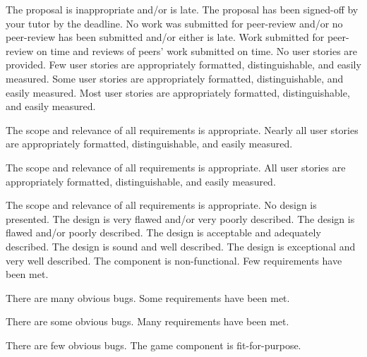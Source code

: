 \documentclass{../fal_assignment}
\begin{document}
\begin{markingrubric}
%
        \grade\fail 	The proposal is inappropriate and/or is late.
        \grade 
        \grade 
        \grade 
        \grade 
        \grade 		The proposal has been signed-off by your tutor by the deadline.
%
        \grade\fail 	No work was submitted for peer-review and/or no peer-review has been submitted and/or either is late.
        \grade 
        \grade 
        \grade 
        \grade 
        \grade 		Work submitted for peer-review on time and reviews of peers' work submitted on time.
%
        \grade\fail 	No user stories are provided.
        \grade 		Few user stories are appropriately formatted, distinguishable, and easily measured.
        \grade 		Some user stories are appropriately formatted, distinguishable, and easily measured.
        \grade 		Most user stories are appropriately formatted, distinguishable, and easily measured.
        \par 		The scope and relevance of all requirements is appropriate.
        \grade 		Nearly all user stories are appropriately formatted, distinguishable, and easily measured.
        \par 		The scope and relevance of all requirements is appropriate.
        \grade 		All user stories are appropriately formatted, distinguishable, and easily measured.
        \par 		The scope and relevance of all requirements is appropriate.
%
        \grade\fail 	No design is presented.
        \grade 		The design is very flawed and/or very poorly described.
        \grade 		The design is flawed and/or poorly described.
        \grade 		The design is acceptable and adequately described.
        \grade 		The design is sound and well described.
        \grade 		The design is exceptional and very well described.
%
        \grade\fail 	The component is non-functional.
        \grade 		Few requirements have been met.
        \par 		There are many obvious bugs.
        \grade 		Some requirements have been met.
        \par 		There are some obvious bugs.
        \grade 		Many requirements have been met.
        \par 		There are few obvious bugs.
        \grade 		The game component is fit-for-purpose.

\end{markingrubric}
\end{document}
